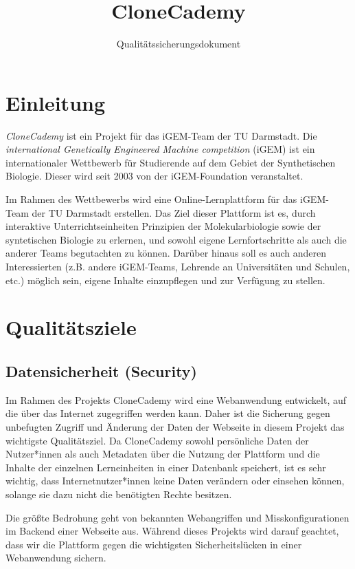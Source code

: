 \documentclass[accentcolor=tud0b,12pt,paper=a4]{tudreport}
\title{CloneCademy}
\subtitle{Qualitätssicherungsdokument}
\begin{document}
\maketitle
\tableofcontents

\chapter{Einleitung}

\emph{CloneCademy} ist ein Projekt für das iGEM-Team der TU Darmstadt. Die \emph{international Genetically Engineered Machine competition} (iGEM) ist ein internationaler Wettbewerb für Studierende auf dem Gebiet der Synthetischen Biologie.
Dieser wird seit 2003 von der iGEM-Foundation veranstaltet. 

Im Rahmen des Wettbewerbs wird eine Online-Lernplattform für das iGEM-Team der TU Darmstadt erstellen. Das Ziel dieser Plattform ist es, durch interaktive Unterrichtseinheiten Prinzipien der Molekularbiologie sowie der syntetischen Biologie zu erlernen, und sowohl eigene Lernfortschritte als auch die anderer Teams begutachten zu können. Darüber hinaus soll es auch anderen Interessierten (z.B. andere iGEM-Teams, Lehrende an Universitäten und Schulen, etc.) möglich sein, eigene Inhalte einzupflegen und zur Verfügung zu stellen.

\chapter{Qualitätsziele}
\section{Datensicherheit (Security)}

Im Rahmen des Projekts CloneCademy wird eine Webanwendung entwickelt, auf die über das Internet zugegriffen werden kann. Daher ist die Sicherung gegen unbefugten Zugriff und Änderung der Daten der Webseite in diesem Projekt das wichtigste Qualitätsziel. Da CloneCademy sowohl persönliche Daten der Nutzer*innen als auch Metadaten über die Nutzung der Plattform und die Inhalte der einzelnen Lerneinheiten in einer Datenbank speichert, ist es sehr wichtig, dass Internetnutzer*innen keine Daten verändern oder einsehen können, solange sie dazu nicht die benötigten Rechte besitzen.
		
Die größte Bedrohung geht von bekannten Webangriffen und Misskonfigurationen im Backend einer Webseite aus. Während dieses Projekts wird darauf geachtet, dass wir die Plattform gegen die wichtigsten Sicherheitslücken in einer Webanwendung sichern.
\end{document}
